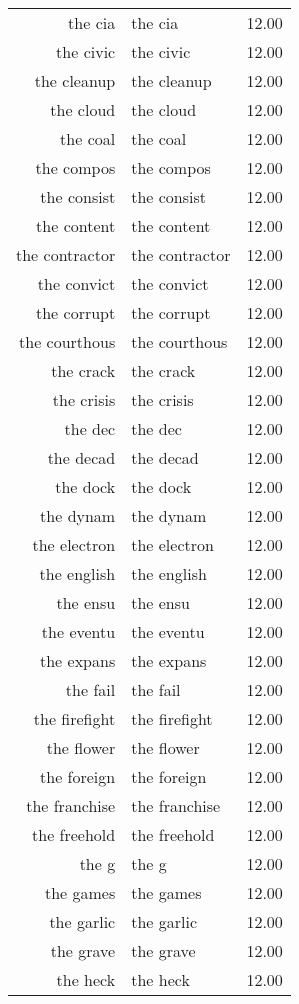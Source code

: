 \begin{table}[ht]
\begin{tabular}{rlr}
  the cia & the cia & 12.00 \\ 
  the civic & the civic & 12.00 \\ 
  the cleanup & the cleanup & 12.00 \\ 
  the cloud & the cloud & 12.00 \\ 
  the coal & the coal & 12.00 \\ 
  the compos & the compos & 12.00 \\ 
  the consist & the consist & 12.00 \\ 
  the content & the content & 12.00 \\ 
  the contractor & the contractor & 12.00 \\ 
  the convict & the convict & 12.00 \\ 
  the corrupt & the corrupt & 12.00 \\ 
  the courthous & the courthous & 12.00 \\ 
  the crack & the crack & 12.00 \\ 
  the crisis & the crisis & 12.00 \\ 
  the dec & the dec & 12.00 \\ 
  the decad & the decad & 12.00 \\ 
  the dock & the dock & 12.00 \\ 
  the dynam & the dynam & 12.00 \\ 
  the electron & the electron & 12.00 \\ 
  the english & the english & 12.00 \\ 
  the ensu & the ensu & 12.00 \\ 
  the eventu & the eventu & 12.00 \\ 
  the expans & the expans & 12.00 \\ 
  the fail & the fail & 12.00 \\ 
  the firefight & the firefight & 12.00 \\ 
  the flower & the flower & 12.00 \\ 
  the foreign & the foreign & 12.00 \\ 
  the franchise & the franchise & 12.00 \\ 
  the freehold & the freehold & 12.00 \\ 
  the g & the g & 12.00 \\ 
  the games & the games & 12.00 \\ 
  the garlic & the garlic & 12.00 \\ 
  the grave & the grave & 12.00 \\ 
  the heck & the heck & 12.00 \\ 

\end{tabular}
\end{table}

